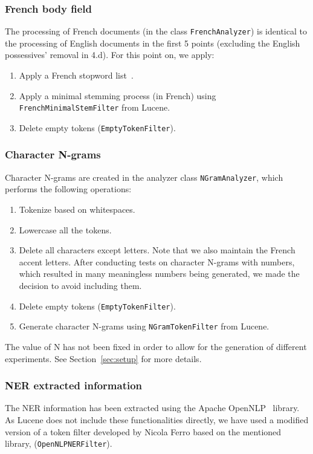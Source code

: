 \subsubsection{French body field}
The processing of French documents (in the class \texttt{FrenchAnalyzer}) is identical to the processing of English
documents in the first 5 points (excluding the English possessives' removal in 4.d).
For this point on, we apply:
\begin{enumerate}[start=6]
    \item Apply a French stopword list~\cite{stopword_french}.
    \item Apply a minimal stemming process (in French) using \texttt{FrenchMinimalStemFilter} from Lucene.
    \item Delete empty tokens (\texttt{EmptyTokenFilter}).
\end{enumerate}

\subsubsection{Character N-grams}
Character N-grams are created in the analyzer class \texttt{NGramAnalyzer}, which performs the following operations:
\begin{enumerate}
    \item Tokenize based on whitespaces.
    \item Lowercase all the tokens.
    \item Delete all characters except letters.
    Note that we also maintain the French accent letters.
    After conducting tests on character N-grams with numbers, which resulted in many meaningless numbers being generated, we made the decision to avoid including them.
    \item Delete empty tokens (\texttt{EmptyTokenFilter}).
    \item Generate character N-grams using \texttt{NGramTokenFilter} from Lucene.
\end{enumerate}
The value of N has not been fixed in order to allow for the generation of different experiments.
See Section~\ref{sec:setup} for more details.

\subsubsection{NER extracted information}
The NER information has been extracted using the Apache OpenNLP~\cite{ApacheOpenNLP} library.
As Lucene does not include these functionalities directly, we have used a modified version of a token filter developed
by Nicola Ferro based on the mentioned library, (\texttt{OpenNLPNERFilter}).\\

